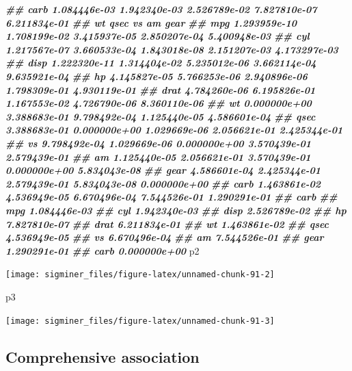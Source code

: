 \documentclass[
  12pt,
  a4paper,
  twoside]{book}
\newenvironment{Shaded}{\begin{snugshade}}{\end{snugshade}}
\newcommand{\DocumentationTok}[1]{\textcolor[rgb]{0.56,0.35,0.01}{\textbf{\textit{#1}}}}
\newcommand{\NormalTok}[1]{#1}
\begin{document}
\begin{Shaded}
\begin{Highlighting}[]
\DocumentationTok{\#\# carb 1.084446e{-}03 1.942340e{-}03 2.526789e{-}02 7.827810e{-}07 6.211834e{-}01}
\DocumentationTok{\#\#                wt         qsec           vs           am         gear}
\DocumentationTok{\#\# mpg  1.293959e{-}10 1.708199e{-}02 3.415937e{-}05 2.850207e{-}04 5.400948e{-}03}
\DocumentationTok{\#\# cyl  1.217567e{-}07 3.660533e{-}04 1.843018e{-}08 2.151207e{-}03 4.173297e{-}03}
\DocumentationTok{\#\# disp 1.222320e{-}11 1.314404e{-}02 5.235012e{-}06 3.662114e{-}04 9.635921e{-}04}
\DocumentationTok{\#\# hp   4.145827e{-}05 5.766253e{-}06 2.940896e{-}06 1.798309e{-}01 4.930119e{-}01}
\DocumentationTok{\#\# drat 4.784260e{-}06 6.195826e{-}01 1.167553e{-}02 4.726790e{-}06 8.360110e{-}06}
\DocumentationTok{\#\# wt   0.000000e+00 3.388683e{-}01 9.798492e{-}04 1.125440e{-}05 4.586601e{-}04}
\DocumentationTok{\#\# qsec 3.388683e{-}01 0.000000e+00 1.029669e{-}06 2.056621e{-}01 2.425344e{-}01}
\DocumentationTok{\#\# vs   9.798492e{-}04 1.029669e{-}06 0.000000e+00 3.570439e{-}01 2.579439e{-}01}
\DocumentationTok{\#\# am   1.125440e{-}05 2.056621e{-}01 3.570439e{-}01 0.000000e+00 5.834043e{-}08}
\DocumentationTok{\#\# gear 4.586601e{-}04 2.425344e{-}01 2.579439e{-}01 5.834043e{-}08 0.000000e+00}
\DocumentationTok{\#\# carb 1.463861e{-}02 4.536949e{-}05 6.670496e{-}04 7.544526e{-}01 1.290291e{-}01}
\DocumentationTok{\#\#              carb}
\DocumentationTok{\#\# mpg  1.084446e{-}03}
\DocumentationTok{\#\# cyl  1.942340e{-}03}
\DocumentationTok{\#\# disp 2.526789e{-}02}
\DocumentationTok{\#\# hp   7.827810e{-}07}
\DocumentationTok{\#\# drat 6.211834e{-}01}
\DocumentationTok{\#\# wt   1.463861e{-}02}
\DocumentationTok{\#\# qsec 4.536949e{-}05}
\DocumentationTok{\#\# vs   6.670496e{-}04}
\DocumentationTok{\#\# am   7.544526e{-}01}
\DocumentationTok{\#\# gear 1.290291e{-}01}
\DocumentationTok{\#\# carb 0.000000e+00}
\NormalTok{p2}
\end{Highlighting}
\end{Shaded}

\texttt{[image: sigminer\_files/figure-latex/unnamed-chunk-91-2]}

\begin{Shaded}
\begin{Highlighting}[]
\NormalTok{p3}
\end{Highlighting}
\end{Shaded}

\texttt{[image: sigminer\_files/figure-latex/unnamed-chunk-91-3]}

\hypertarget{comprehensive-association}{%
\subsection{Comprehensive association}\label{comprehensive-association}}
\end{document}
